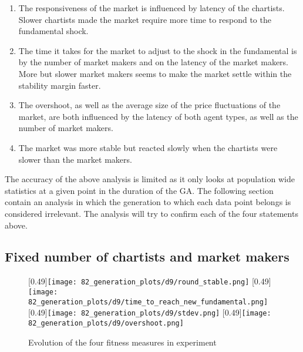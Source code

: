 \begin{enumerate}
\item The responsiveness of the market is influenced by latency of the chartists. Slower chartists made the market require more time to respond to the fundamental shock.
\item The time it takes for the market to adjust to the shock in the fundamental is by the number of market makers and on the latency of the market makers. More but slower market makers seems to make the market settle within the stability margin faster.
\item The overshoot, as well as the average size of the price fluctuations of the market, are both influenced by the latency of both agent types, as well as the number of market makers.
\item The market was more stable but reacted slowly when the chartists were slower than the market makers.
\end{enumerate}
The accuracy of the above analysis is limited as it only looks at population wide statistics at a given point in the duration of the GA. The following section contain an analysis in which the generation to which each data point belongs is considered irrelevant. The analysis will try to confirm each of the four statements above.

\subsection{Fixed number of chartists and market makers}

\begin{figure}
	\centering
	[0.49\linewidth]{\texttt{[image: 82\_generation\_plots/d9/round\_stable.png]}}
	[0.49\linewidth]{\texttt{[image: 82\_generation\_plots/d9/time\_to\_reach\_new\_fundamental.png]}}
	\vspace{0.5cm}
	[0.49\linewidth]{\texttt{[image: 82\_generation\_plots/d9/stdev.png]}}
	[0.49\linewidth]{\texttt{[image: 82\_generation\_plots/d9/overshoot.png]}}
	\caption{Evolution of the four fitness measures in experiment \dnine}
	\label{fig:d9_evolution_fitness}
\end{figure}


